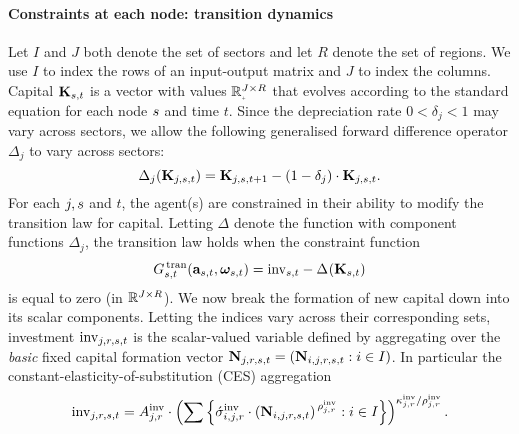 \documentclass[12pt,a4paper,twoside, draft]{article}
\begin{document}
\paragraph{Constraints at each node: transition dynamics}
Let $I$ and $J$ both denote the set of sectors and let $R$ denote the set of
regions.
We use $I$ to index the rows of an input-output matrix and $J$ to index the
columns.
Capital $\mathbf{K}_{{s}, t}$ is a vector with values
$\nnreal ^ {J \times R}$ that evolves according to the standard equation for
each node ${s}$ and time $t$.
Since the depreciation rate $0 < \delta_{j} < 1$ may vary across sectors, we
allow the following generalised forward difference operator $\Delta_j$ to vary
across sectors:
\[
  \Delta_{j}(\mathbf{K}_{j, {s}, t})
    = \mathbf{K}_{j, {s}, t + 1} -
      (1 - \delta_j) \cdot \mathbf{K}_{j, {s}, t}. 
\]
For each $j, {s} $ and $t$, the agent(s) are constrained in their ability to
modify the transition law for capital.
Letting $\Delta$ denote the function with component functions
$\Delta_{j}$, the transition law holds when the constraint function
\begin{equation}\label{eq-kapital}
  G_{{s}, t}^{\,\textup{tran}}(
    \mathbf{a}_{{s}, t}, \boldsymbol{\omega}_{{s}, t}
  )
    = \textup{inv}_{{s}, t}
      - \Delta_{}(\mathbf{K}_{{s}, t})
\end{equation}
is equal to zero (in $\mathbb R^{J \times R}$).
We now break the formation of new capital down into its scalar components.
Letting the indices vary across their corresponding sets, investment
$\textup{inv}_{j, r, {s}, t}$ is the scalar-valued variable defined by
aggregating over the \emph{basic} fixed capital formation vector
$\mathbf{N}_{j, r, {s}, t} = (\mathbf{N}_{i,j, r, {s}, t}: i \in I)$.
In particular the constant-elasticity-of-substitution (CES) aggregation
\begin{equation}\label{eq-ces-inv}
  \textup{inv}_{j, r, \node, t} = A_{j, r}^{\textup{inv}}
    \cdot \left(\sum%
      \left\{
      \acute \sigma_{i,j, r}^{\textup{inv}}
        \cdot \left( \mathbf{N}_{i,j, r, \node, t}\right)
        ^ {\,\rho_{j, r} ^ {\textup{inv}}}
      : i \in I\right\}
    \right) ^ {\kappa_{j, r}^{\textup{inv}} / \rho_{j, r}^{\textup{inv}}}.
\end{equation}
\end{document}
